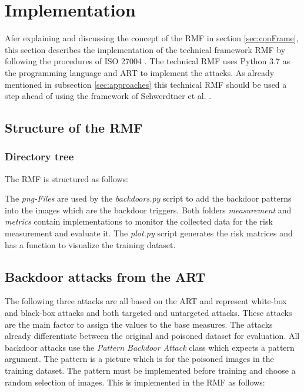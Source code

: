 \section{Implementation}
\label{sec:implementation}

Afer explaining and discussing the concept of the RMF in section \ref{sec:conFrame}, this section describes the implementation of the technical framework RMF by following the procedures of ISO 27004 \cite{ISO_27004_2009}. The technical RMF uses Python 3.7 \cite{10.5555/1593511} as the programming language and ART to implement the attacks. As already mentioned in subsection \ref{sec:approaches} this technical RMF should be used a step ahead of using the framework of Schwerdtner et al. \cite{DBLP:journals/corr/abs-2011-04328}.

\subsection{Structure of the RMF}

\subsubsection*{Directory tree}

The RMF is structured as follows: \\


\hfill \break \noindent The \textit{png-Files} are used by the \textit{backdoors.py} script to add the backdoor patterns into the images which are the backdoor triggers. Both folders \textit{measurement} and \textit{metrics} contain implementations to monitor the collected data for the risk measurement and evaluate it. The \textit{plot.py} script generates the risk matrices and has a function to visualize the training dataset.

\subsection{Backdoor attacks from the ART}
\label{sec:impl_backdoor_attacks}

The following three attacks are all based on the ART \cite{art2018} and represent white-box and black-box attacks and both targeted and untargeted attacks. These attacks are the main factor to assign the values to the base measures. The attacks already differentiate between the original and poisoned dataset for evaluation.
All backdoor attacks use the \textit{Pattern Backdoor Attack} \cite{DBLP:journals/corr/abs-1708-06733} class which expects a pattern argument. The pattern is a picture which is for the poisoned images in the training dataset. The pattern must be implemented before training and choose a random selection of images. This is implemented in the RMF as follows:


